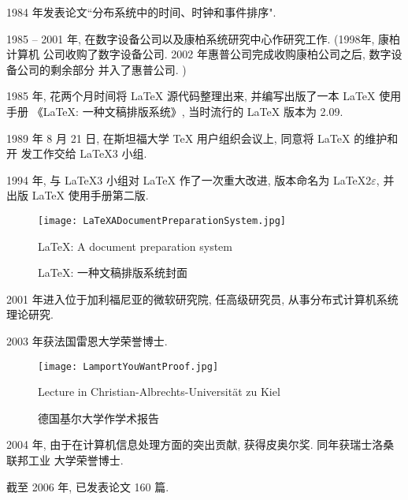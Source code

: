 1984 年发表论文``分布系统中的时间、时钟和事件排序".

1985 -- 2001 年, 在数字设备公司以及康柏系统研究中心作研究工作. (1998年, 康柏计算机
公司收购了数字设备公司. 2002 年惠普公司完成收购康柏公司之后, 数字设备公司的剩余部分
并入了惠普公司. )

1985 年, 花两个月时间将 \LaTeX{} 源代码整理出来, 并编写出版了一本 \LaTeX{} 使用手册
《\LaTeX: 一种文稿排版系统》, 当时流行的 \LaTeX{} 版本为 2.09.

1989 年 8 月 21 日, 在斯坦福大学 \TeX{} 用户组织会议上, 同意将 \LaTeX{} 的维护和开
发工作交给 \LaTeX{}3 小组.

1994 年, 与 \LaTeX{}3 小组对 \LaTeX{} 作了一次重大改进, 版本命名为 \LaTeX{}2$\varepsilon$,
并出版 \LaTeX{} 使用手册第二版.

\begin{figure}
  \centering
  \texttt{[image: LaTeXADocumentPreparationSystem.jpg]}\\
  \caption{\LaTeX: 一种文稿排版系统封面}{\LaTeX: A document preparation system}
\end{figure}


2001 年进入位于加利福尼亚的微软研究院, 任高级研究员, 从事分布式计算机系统理论研究.

2003 年获法国雷恩大学荣誉博士.

\begin{figure}
  \centering
  \texttt{[image: LamportYouWantProof.jpg]}\\
  \caption{德国基尔大学作学术报告}{Lecture in Christian-Albrechts-Universit\"{a}t zu Kiel}
\end{figure}

2004 年, 由于在计算机信息处理方面的突出贡献, 获得皮奥尔奖. 同年获瑞士洛桑联邦工业
大学荣誉博士.

截至 2006 年, 已发表论文 160 篇.
